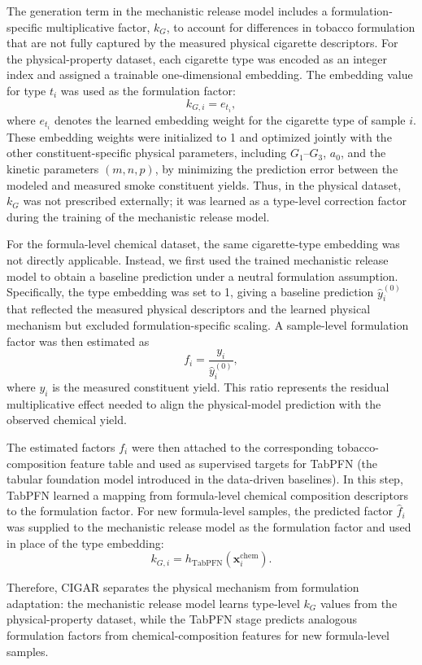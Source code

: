 ﻿\documentclass[a4paper,fleqn]{cas-sc}
\begin{document}
The generation term in the mechanistic release model includes a formulation-specific multiplicative factor, $k_G$, to account for differences in tobacco formulation that are not fully captured by the measured physical cigarette descriptors. For the physical-property dataset, each cigarette type was encoded as an integer index and assigned a trainable one-dimensional embedding. The embedding value for type $t_i$ was used as the formulation factor:
\[
k_{G,i}=e_{t_i},
\]
where $e_{t_i}$ denotes the learned embedding weight for the cigarette type of sample $i$. These embedding weights were initialized to 1 and optimized jointly with the other constituent-specific physical parameters, including $G_1$--$G_3$, $a_0$, and the kinetic parameters $(m,n,p)$, by minimizing the prediction error between the modeled and measured smoke constituent yields. Thus, in the physical dataset, $k_G$ was not prescribed externally; it was learned as a type-level correction factor during the training of the mechanistic release model.

For the formula-level chemical dataset, the same cigarette-type embedding was not directly applicable. Instead, we first used the trained mechanistic release model to obtain a baseline prediction under a neutral formulation assumption. Specifically, the type embedding was set to 1, giving a baseline prediction $\hat{y}_i^{(0)}$ that reflected the measured physical descriptors and the learned physical mechanism but excluded formulation-specific scaling. A sample-level formulation factor was then estimated as
\[
f_i=\frac{y_i}{\hat{y}_i^{(0)}},
\]
where $y_i$ is the measured constituent yield. This ratio represents the residual multiplicative effect needed to align the physical-model prediction with the observed chemical yield.

The estimated factors $f_i$ were then attached to the corresponding tobacco-composition feature table and used as supervised targets for TabPFN (the tabular foundation model introduced in the data-driven baselines). In this step, TabPFN learned a mapping from formula-level chemical composition descriptors to the formulation factor. For new formula-level samples, the predicted factor $\hat{f}_i$ was supplied to the mechanistic release model as the formulation factor and used in place of the type embedding:
\[
k_{G,i} = h_{\mathrm{TabPFN}}(\mathbf{x}_i^{\mathrm{chem}}).
\]

Therefore, CIGAR separates the physical mechanism from formulation adaptation: the mechanistic release model learns type-level $k_G$ values from the physical-property dataset, while the TabPFN stage predicts analogous formulation factors from chemical-composition features for new formula-level samples.
\end{document}
